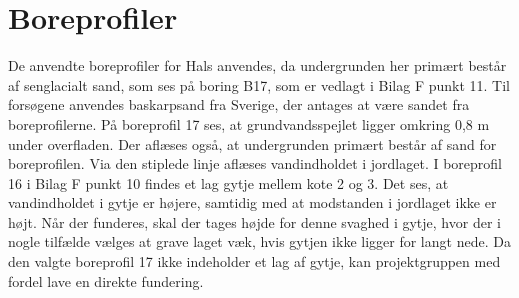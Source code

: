 \section{Boreprofiler} 
De anvendte boreprofiler for Hals anvendes, da undergrunden her primært består af senglacialt sand, som ses på boring B17, som er vedlagt i Bilag F punkt 11. Til forsøgene anvendes baskarpsand fra Sverige, der antages at være sandet fra boreprofilerne. 
\newline \indent{     }  På boreprofil 17 ses, at grundvandsspejlet ligger omkring 0,8 m under overfladen. Der aflæses også, at undergrunden primært består af sand for boreprofilen. Via den stiplede linje aflæses vandindholdet i jordlaget. 
\newline \indent{     }  I boreprofil 16 i Bilag F punkt 10 findes et lag gytje mellem kote 2 og 3. Det ses, at vandindholdet i gytje er højere, samtidig med at modstanden i jordlaget ikke er højt. Når der funderes, skal der tages højde for denne svaghed i gytje, hvor der i nogle tilfælde vælges at grave laget væk, hvis gytjen ikke ligger for langt nede. Da den valgte boreprofil 17 ikke indeholder et lag af gytje, kan projektgruppen med fordel lave en direkte fundering.